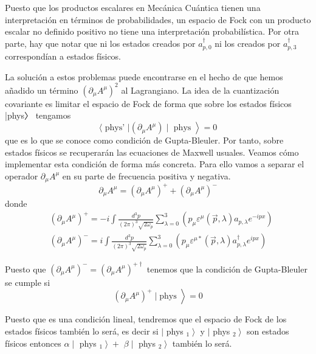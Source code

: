 Puesto que los productos escalares en Mecánica Cuántica tienen una interpretación en términos de probabilidades, un espacio de Fock con un producto escalar no definido positivo no tiene una interpretación probabilística. Por otra parte, hay que notar que ni los estados creados por $a_{p, 0}^{\dagger}$ ni los creados por $a_{p, 3}^{\dagger}$ correspondían a estados físicos.



La solución a estos problemas puede encontrarse en el hecho de que hemos añadido un término $\left(\partial_{\mu} A^{\mu}\right)^{2}$ al Lagrangiano. La idea de la cuantización covariante es limitar el espacio de Fock de forma que sobre los estados físicos |phys〉 tengamos
\begin{equation*}
\left.\langle\text { phys' }|\left(\partial_{\mu} A^{\mu}\right) \mid \text { phys }\right\rangle=0 \tag{6.63}
\end{equation*}
que es lo que se conoce como condición de Gupta-Bleuler. Por tanto, sobre estados físicos se recuperarán las ecuaciones de Maxwell usuales. Veamos cómo implementar esta condición de forma más concreta. Para ello vamos a separar el operador $\partial_{\mu} A^{\mu}$ en su parte de frecuencia positiva y negativa.
\begin{equation*}
\partial_{\mu} A^{\mu}=\left(\partial_{\mu} A^{\mu}\right)^{+}+\left(\partial_{\mu} A^{\mu}\right)^{-} \tag{6.64}
\end{equation*}
donde
$$
\begin{align*}
& \left(\partial_{\mu} A^{\mu}\right)^{+}=-i \int \frac{d^{3} p}{(2 \pi)^{3} \sqrt{2 \omega_{p}}} \sum_{\lambda=0}^{3}\left(p_{\mu} \varepsilon^{\mu}(\vec{p}, \lambda) a_{p, \lambda} e^{-i p x}\right) \\
& \left(\partial_{\mu} A^{\mu}\right)^{-}=i \int \frac{d^{3} p}{(2 \pi)^{3} \sqrt{2 \omega_{p}}} \sum_{\lambda=0}^{3}\left(p_{\mu} \varepsilon^{\mu *}(\vec{p}, \lambda) a_{p, \lambda}^{\dagger} e^{i p x}\right) \tag{6.65}
\end{align*}
$$

Puesto que $\left(\partial_{\mu} A^{\mu}\right)^{-}=\left(\partial_{\mu} A^{\mu}\right)^{+\dagger}$ tenemos que la condición de Gupta-Bleuler se cumple si
\begin{equation*}
\left.\left(\partial_{\mu} A^{\mu}\right)^{+} \mid \text {phys }\right\rangle=0 \tag{6.66}
\end{equation*}

Puesto que es una condición lineal, tendremos que el espacio de Fock de los estados físicos también lo será, es decir si $\mid$ phys $\left._{1}\right\rangle$ y $\mid$ phys $\left._{2}\right\rangle$ son estados físicos entonces $\alpha \mid$ phys $\left._{1}\right\rangle+$ $\beta \mid$ phys $\left._{2}\right\rangle$ también lo será.

